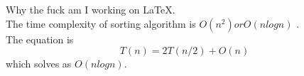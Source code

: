 \documentclass[11pt]{article}
\begin{document}
Why the fuck am I working on LaTeX.\\
The time complexity  of sorting algorithm is $O(n^2) or O(nlogn)$ .\\
The equation is $$T(n)=2T(n/2)+O(n)$$
which solves as $O(nlogn)$.
\end{document}

